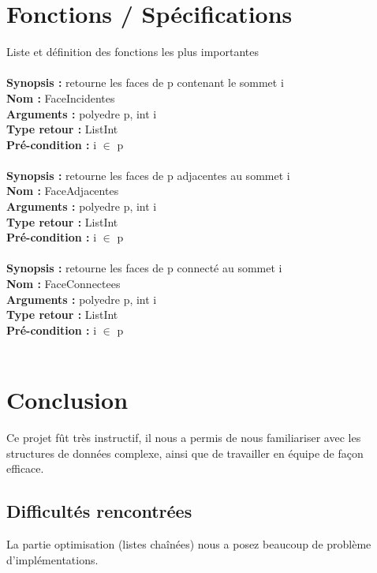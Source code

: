 \documentclass[a4paper,11pt]{article}
\begin{document}
\section{Fonctions / Spécifications}
Liste et définition des fonctions les plus importantes
\\
\\
\textbf{{Synopsis :}} retourne les faces de p contenant le sommet i
\\
\textbf{{Nom :}} FaceIncidentes
\\
\textbf{{Arguments :}} polyedre p, int i
\\
\textbf{{Type retour :}} ListInt
\\
\textbf{{Pré-condition :}} i ${\in}$ p
\\
\\
\textbf{{Synopsis :}} retourne les faces de p adjacentes au sommet i
\\
\textbf{{Nom :}} FaceAdjacentes
\\
\textbf{{Arguments :}} polyedre p, int i
\\
\textbf{{Type retour :}} ListInt
\\
\textbf{{Pré-condition :}} i ${\in}$ p
\\
\\
\textbf{{Synopsis :}} retourne les faces de p connecté au sommet i
\\
\textbf{{Nom :}} FaceConnectees
\\
\textbf{{Arguments :}} polyedre p, int i
\\
\textbf{{Type retour :}} ListInt
\\
\textbf{{Pré-condition :}} i ${\in}$ p
\\
\\
\newpage
\section{Conclusion}
Ce projet fût très instructif, il nous a permis de nous familiariser avec les structures de données complexe, ainsi que de travailler en équipe de façon efficace.
\subsection{Difficultés rencontrées}
La partie optimisation (listes chaînées) nous a posez beaucoup de problème d'implémentations.
\end{document}
